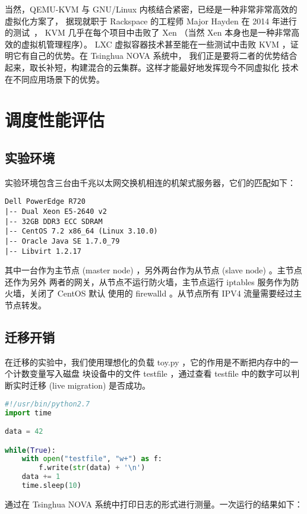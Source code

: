 当然，QEMU-KVM 与 GNU/Linux 内核结合紧密，已经是一种非常非常高效的虚拟化方案了，
据现就职于 Rackspace 的工程师 Major Hayden 在 2014 年进行的测试~\cite{kvm-vs-xen}，
KVM 几乎在每个项目中击败了 Xen （当然 Xen 本身也是一种非常高效的虚拟机管理程序）。
LXC 虚拟容器技术甚至能在一些测试中击败 KVM ，证明它有自己的优势。在 Tsinghua NOVA 系统中，
我们正是要将二者的优势结合起来，取长补短，构建混合的云集群。这样才能最好地发挥现今不同虚拟化
技术在不同应用场景下的优势。

\section{调度性能评估}

\subsection{实验环境}

实验环境包含三台由千兆以太网交换机相连的机架式服务器，它们的匹配如下：

\begin{lstlisting}
Dell PowerEdge R720
|-- Dual Xeon E5-2640 v2
|-- 32GB DDR3 ECC SDRAM
|-- CentOS 7.2 x86_64 (Linux 3.10.0)
|-- Oracle Java SE 1.7.0_79
|-- Libvirt 1.2.17
\end{lstlisting}

其中一台作为主节点 (master node) ，另外两台作为从节点 (slave node) 。主节点还作为另外
两者的网关，从节点不运行防火墙，主节点运行 iptables 服务作为防火墙，关闭了 CentOS 默认
使用的 firewalld 。从节点所有 IPV4 流量需要经过主节点转发。

\subsection{迁移开销}

在迁移的实验中，我们使用理想化的负载 toy.py ，它的作用是不断把内存中的一个计数变量写入磁盘
块设备中的文件 testfile ，通过查看 testfile 中的数字可以判断实时迁移 (live migration)
是否成功。

\begin{lstlisting}[language=Python]
#!/usr/bin/python2.7
import time

data = 42

while(True):
    with open("testfile", "w+") as f:
        f.write(str(data) + '\n')
    data += 1
    time.sleep(10)
\end{lstlisting}

通过在 Tsinghua NOVA 系统中打印日志的形式进行测量。一次运行的结果如下：

